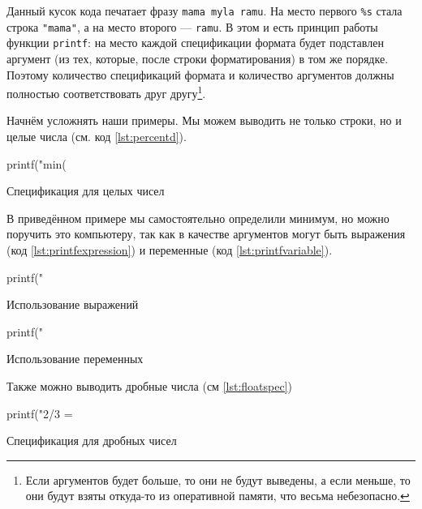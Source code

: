 \documentclass[12pt]{article}
\begin{document}
Данный кусок кода печатает фразу \verb|mama myla ramu|. На место первого \verb|%s| стала строка \verb|"mama"|, а на место второго --- \verb|ramu|. В этом и есть принцип работы функции \verb|printf|: на место каждой спецификации формата будет подставлен аргумент (из тех, которые, после строки форматирования) в том же порядке. Поэтому количество спецификаций формата и количество аргументов должны полностью соответствовать друг другу\footnote{Если аргументов будет больше, то они не будут выведены, а если меньше, то они будут взяты откуда-то из оперативной памяти, что весьма небезопасно.}.

Начнём усложнять наши примеры. Мы можем выводить не только строки, но и целые числа (см. код \ref{lst:percentd}).
\begin{listing}[ht]
\begin{center}
\begin{ccode}
printf("min(%
\end{ccode}
\end{center}
\caption{Спецификация для целых чисел}
\label{lst:percentd}
\end{listing}
В приведённом примере мы самостоятельно определили минимум, но можно поручить это компьютеру, так как в качестве аргументов могут быть выражения (код \ref{lst:printfexpression}) и переменные (код \ref{lst:printfvariable}).
\begin{listing}[ht]
\begin{center}
\begin{ccode}
printf("%
\end{ccode}
\end{center}
\caption{Использование выражений}
\label{lst:printfexpression}
\end{listing}
\begin{listing}[ht]
\begin{center}
\begin{ccode}
printf("%
\end{ccode}
\end{center}
\caption{Использование переменных}
\label{lst:printfvariable}
\end{listing}

Также можно выводить дробные числа (см \ref{lst:floatspec})
\begin{listing}[ht]
\begin{center}
\begin{ccode}
printf("2/3 = %
\end{ccode}
\end{center}
\caption{Спецификация для дробных чисел}
\label{lst:floatspec}
\end{listing}
\end{document}
